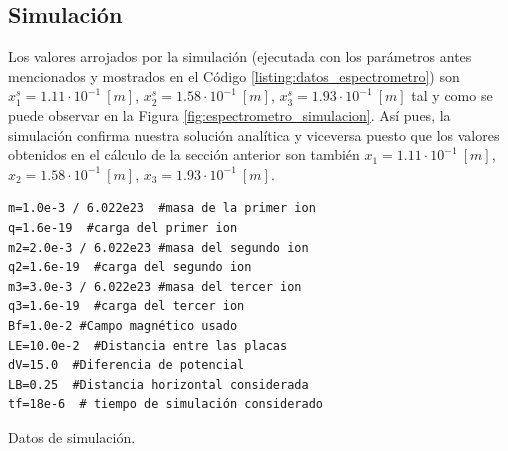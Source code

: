 \documentclass[journal]{IEEEtran}
\newenvironment{code}{\captionsetup{type=listing}}{\par\addvspace{\baselineskip}}
\begin{document}
\subsection{Simulación}

Los valores arrojados por la simulación (ejecutada con los parámetros antes mencionados y mostrados en el Código \ref{listing:datos_espectrometro}) son $x^s_1 = 1.11\cdot 10^{-1}~[m]$, $x^s_2 = 1.58\cdot 10^{-1}~[m]$, $x^s_3 = 1.93\cdot 10^{-1}~[m]$ tal y como se puede observar en la Figura \ref{fig:espectrometro_simulacion}. Así pues, la simulación confirma nuestra solución analítica y viceversa puesto que los valores obtenidos en el cálculo de la sección anterior son también $x_1 = 1.11\cdot 10^{-1}~[m]$, $x_2 = 1.58\cdot 10^{-1}~[m]$, $x_3 = 1.93\cdot 10^{-1}~[m]$.

\bigskip

\begin{code}
    \begin{verbatim}
m=1.0e-3 / 6.022e23  #masa de la primer ion
q=1.6e-19  #carga del primer ion
m2=2.0e-3 / 6.022e23 #masa del segundo ion
q2=1.6e-19  #carga del segundo ion
m3=3.0e-3 / 6.022e23 #masa del tercer ion
q3=1.6e-19  #carga del tercer ion
Bf=1.0e-2 #Campo magnético usado
LE=10.0e-2  #Distancia entre las placas
dV=15.0  #Diferencia de potencial
LB=0.25  #Distancia horizontal considerada
tf=18e-6  # tiempo de simulación considerado 
    \end{verbatim}
    \caption{Datos de simulación.}
    \label{listing:datos_espectrometro}
\end{code}
\end{document}
